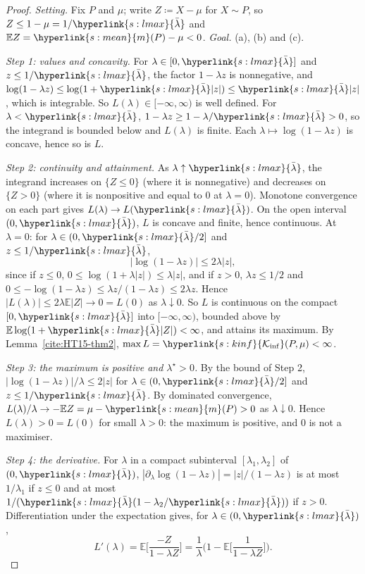 \documentclass[11pt]{article}
\newcommand{\E}{\mathbb{E}}
\newcommand{\sy}[2]{{\hyperlink{#1}{#2}}}
\newcommand{\mean}{\sy{s:mean}{m}}
\newcommand{\Kinf}{\sy{s:kinf}{\mathcal{K}_{\inf}}}
\newcommand{\lmax}{\sy{s:lmax}{\bar{\lambda}}}
\begin{document}
\begin{proof}
\emph{Setting.} Fix $P$ and $\mu$; write $Z\coloneqq X-\mu$ for $X\sim P$, so $Z\le1-\mu=1/\lmax$
and $\E Z=\mean(P)-\mu<0$. \emph{Goal.} (a), (b) and (c).

\emph{Step 1: values and concavity.} For $\lambda\in[0,\lmax]$ and $z\le1/\lmax$, the factor
$1-\lambda z$ is nonnegative, and $\log(1-\lambda z)\le\log(1+\lmax|z|)\le\lmax|z|$, which is
integrable. So $L(\lambda)\in[-\infty,\infty)$ is well defined. For $\lambda<\lmax$,
$1-\lambda z\ge1-\lambda/\lmax>0$, so the integrand is bounded below and $L(\lambda)$ is finite. Each
$\lambda\mapsto\log(1-\lambda z)$ is concave, hence so is $L$.

\emph{Step 2: continuity and attainment.} As $\lambda\uparrow\lmax$, the integrand increases on
$\{Z\le0\}$ (where it is nonnegative) and decreases on $\{Z>0\}$ (where it is nonpositive and equal
to $0$ at $\lambda=0$). Monotone convergence on each part gives $L(\lambda)\to L(\lmax)$. On the open
interval $(0,\lmax)$, $L$ is concave and finite, hence continuous. At $\lambda=0$: for
$\lambda\in(0,\lmax/2]$ and $z\le1/\lmax$,
\begin{equation*}
  |\log(1-\lambda z)|\le2\lambda|z|,
\end{equation*}
since if $z\le0$, $0\le\log(1+\lambda|z|)\le\lambda|z|$, and if $z>0$, $\lambda z\le1/2$ and
$0\le-\log(1-\lambda z)\le\lambda z/(1-\lambda z)\le2\lambda z$. Hence
$|L(\lambda)|\le2\lambda\E|Z|\to0=L(0)$ as $\lambda\downarrow0$. So $L$ is continuous on the compact
$[0,\lmax]$ into $[-\infty,\infty)$, bounded above by $\E\log(1+\lmax|Z|)<\infty$, and attains its
maximum. By Lemma~\ref{cite:HT15-thm2}, $\max L=\Kinf(P,\mu)<\infty$.

\emph{Step 3: the maximum is positive and $\lambda^\star>0$.} By the bound of Step 2,
$|\log(1-\lambda z)|/\lambda\le2|z|$ for $\lambda\in(0,\lmax/2]$ and $z\le1/\lmax$. By
dominated convergence, $L(\lambda)/\lambda\to-\E Z=\mu-\mean(P)>0$ as $\lambda\downarrow0$. Hence
$L(\lambda)>0=L(0)$ for small $\lambda>0$: the maximum is positive, and $0$ is not a maximiser.

\emph{Step 4: the derivative.} For $\lambda$ in a compact subinterval $[\lambda_1,\lambda_2]$ of
$(0,\lmax)$, $|\partial_\lambda\log(1-\lambda z)|=|z|/(1-\lambda z)$ is at most $1/\lambda_1$ if
$z\le0$ and at most $1/(\lmax(1-\lambda_2/\lmax))$ if $z>0$. Differentiation under the expectation
gives, for $\lambda\in(0,\lmax)$,
\[
  L'(\lambda)=\E\Big[\frac{-Z}{1-\lambda Z}\Big]=\frac1\lambda\Big(1-\E\Big[\frac{1}{1-\lambda Z}\Big]\Big).
\]


\end{proof}
\end{document}
